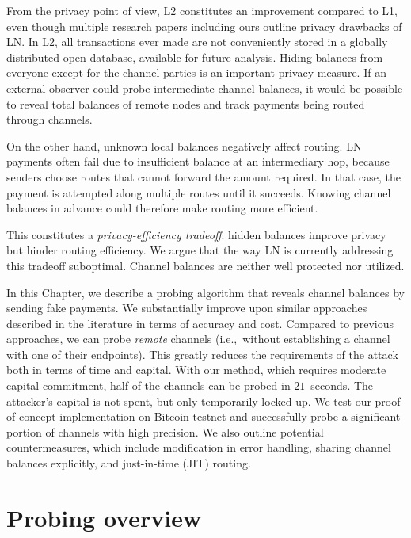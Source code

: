 From the privacy point of view, L2 constitutes an improvement compared to L1, even though multiple research papers including ours outline privacy drawbacks of LN.
In L2, all transactions ever made are not conveniently stored in a globally distributed open database, available for future analysis.
Hiding balances from everyone except for the channel parties is an important privacy measure.
If an external observer could probe intermediate channel balances, it would be possible to reveal total balances of remote nodes and track payments being routed through channels.

On the other hand, unknown local balances negatively affect routing.
LN payments often fail due to insufficient balance at an intermediary hop, because senders choose routes that cannot forward the amount required.
In that case, the payment is attempted along multiple routes until it succeeds.
Knowing channel balances in advance could therefore make routing more efficient.

This constitutes a \textit{privacy-efficiency tradeoff}: hidden balances improve privacy but hinder routing efficiency.
We argue that the way LN is currently addressing this tradeoff suboptimal.
Channel balances are neither well protected nor utilized.

In this Chapter, we describe a probing algorithm that reveals channel balances by sending fake payments.
We substantially improve upon similar approaches described in the literature in terms of accuracy and cost.
Compared to previous approaches, we can probe \textit{remote} channels (i.e.,~without establishing a channel with one of their endpoints).
This greatly reduces the requirements of the attack both in terms of time and capital.
With our method, which requires moderate capital commitment, half of the channels can be probed in $21$~seconds.
The attacker's capital is not spent, but only temporarily locked up.
We test our proof-of-concept implementation on Bitcoin testnet and successfully probe a significant portion of channels with high precision.
We also outline potential countermeasures, which include modification in error handling, sharing channel balances explicitly, and just-in-time (JIT) routing.


\section{Probing overview} \label{sec:probing}

